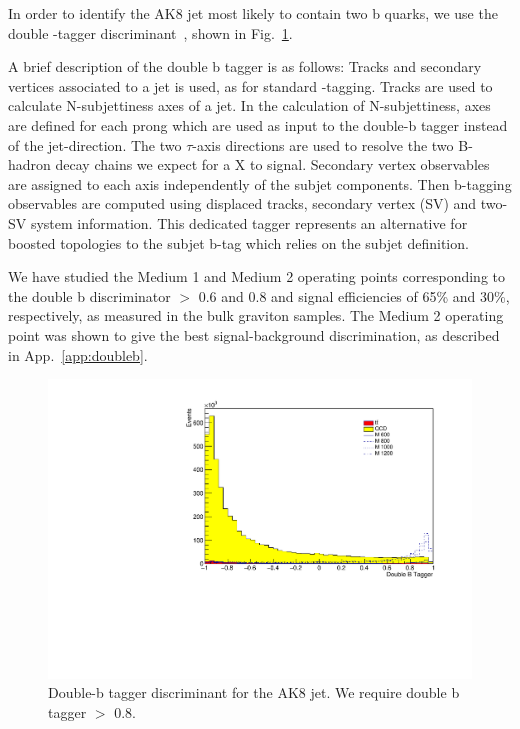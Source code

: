 In order to identify the AK8 jet most likely to contain two b quarks, we use the double \cPqb-tagger discriminant~\cite{CMS-PAS-BTV-15-002}, shown in Fig.~\ref{fig:doubleb}.

A brief description of the double b tagger is as follows: Tracks and secondary vertices associated to a jet is used, as for standard \cPqb-tagging. Tracks are used to calculate N-subjettiness axes of a jet. In the calculation of N-subjettiness, axes are defined for each prong which are used as input to the double-b tagger instead of the jet-direction. The two $\tau$-axis directions are used to resolve the two B-hadron decay chains we expect for a X to \bbbar signal. Secondary vertex observables are assigned to each axis independently of the subjet components. Then  b-tagging observables are computed using displaced  tracks, secondary vertex (SV) and two-SV system information. This dedicated tagger represents an alternative for boosted topologies to the subjet b-tag which relies on the subjet definition.

We have studied the Medium 1 and Medium 2 operating points corresponding to the double b discriminator $>$ 0.6 and 0.8 and signal efficiencies of 65\% and 30\%, respectively, as measured in the bulk graviton samples. The Medium 2 operating point was shown to give the best signal-background discrimination, as described in App.~\ref{app:doubleb}.

\begin{figure}[h]
\begin{center}
\includegraphics[scale=0.5]{F5/shapedoubleb.pdf}
\end{center}
\caption{Double-b tagger discriminant for the AK8 jet. We require double b tagger $>$ 0.8.}
\label{fig:doubleb}
\end{figure} 

